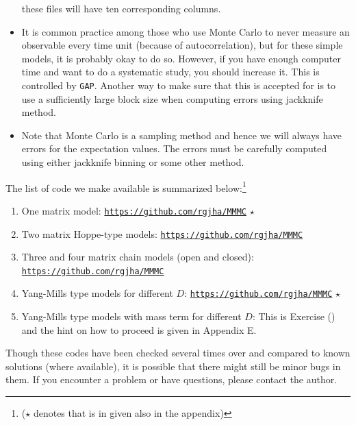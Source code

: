 \documentclass[11pt]{article}
\begin{document}
\begin{itemize}
these files will have ten corresponding columns. 
\item It is common practice among those who use Monte Carlo to never measure an observable every time unit (because of autocorrelation), but for these simple models, it is probably okay to do so. However, if you
have enough computer time and want to do a systematic study, you should increase it. This is controlled by \texttt{GAP}. Another way to make sure that this is accepted for is to use a sufficiently large block size when computing errors using jackknife method. 
\item Note that Monte Carlo is a sampling method and hence we will always have errors for the expectation values. The errors must be carefully computed using either jackknife binning or some other method. 
\end{itemize} 

The list of code we make available is summarized below:\footnote{($\star$ denotes that is in given also in the appendix)}
\begin{enumerate}
\item One matrix model: \texttt{\href{https://github.com/rgjha/MMMC}{https://github.com/rgjha/MMMC}}  ${\star}$
\item Two matrix Hoppe-type models: \texttt{\href{https://github.com/rgjha/MMMC}{https://github.com/rgjha/MMMC}}  
\item Three and four matrix chain models (open and closed): \texttt{\href{https://github.com/rgjha/MMMC}{https://github.com/rgjha/MMMC}}
\item Yang-Mills type models for different $D$: \texttt{\href{https://github.com/rgjha/MMMC}{https://github.com/rgjha/MMMC}} ${\star}$
\item Yang-Mills type models with mass term for different $D$: This is Exercise () and the hint on how to proceed 
is given in Appendix E.
\end{enumerate}

Though these codes have been checked  several times over 
and compared to known solutions (where available), it is possible 
that there might still be minor bugs in them. If you encounter a problem or 
have questions, please contact the author. 
\end{document}
